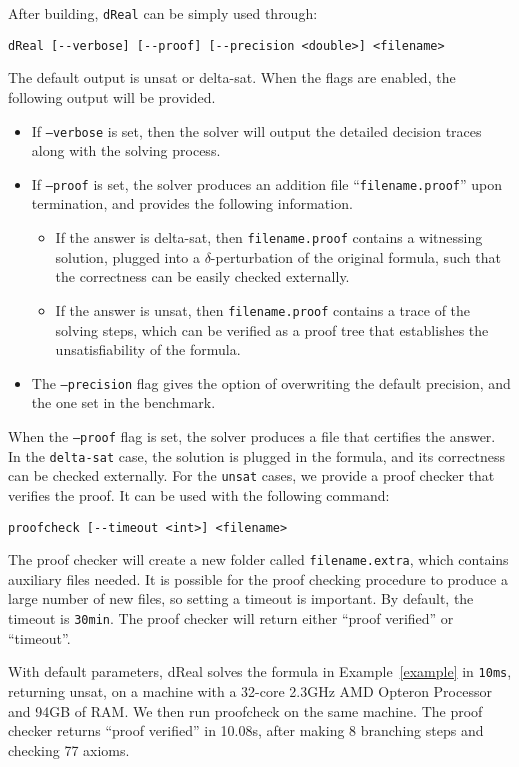 \documentclass[envcountsect]{llncs}
\begin{document}
After building, {\tt dReal} can be simply used through:
\begin{verbatim}
dReal [--verbose] [--proof] [--precision <double>] <filename>
\end{verbatim}
The default output is {\sf unsat} or {\sf delta-sat}. When the flags are
enabled, the following output will be provided.
\begin{itemize}
 \item If {\tt --verbose} is set, then the solver will output the detailed
decision traces along with the solving process. 
\item If {\tt --proof} is set, the solver produces an addition file
``{\tt filename.proof}'' upon termination, and provides the following
information.
\begin{itemize}
\item If the answer is {\sf delta-sat},
then {\tt filename.proof} contains a witnessing solution, plugged into a
$\delta$-perturbation of the original formula, such
that the correctness can be easily checked externally. 

\item If the answer is {\sf unsat}, then {\tt filename.proof} contains a trace
of the solving steps, which can be verified as a proof tree that establishes the
unsatisfiability of the formula.  
\end{itemize}
\item The {\tt --precision} flag gives the option of overwriting the
default precision, and the one set in the benchmark.
\end{itemize}
When the {\tt --proof} flag is set, the solver produces a file that certifies
the answer. In the {\tt delta-sat} case, the solution is plugged in the
formula, and its correctness can be checked externally. For the {\tt unsat}
cases, we provide a proof checker that verifies the proof. It can be used with the following command:
\begin{verbatim}
proofcheck [--timeout <int>] <filename>
\end{verbatim}
The proof checker will create a new folder called {\tt filename.extra}, which
contains auxiliary files needed. It is possible for the proof
checking procedure to produce a large number of new files, so setting a
 timeout is important. By default, the timeout is {\tt 30min}. The proof
checker will return either ``{\sf proof verified}'' or ``{\sf timeout}''.

\begin{example}
With default parameters, {\sf dReal} solves the formula in
Example~\ref{example} in {\tt 10ms}, returning {\sf unsat}, on a machine with
a 32-core 2.3GHz AMD Opteron Processor and 94GB of RAM. We then run {\sf proofcheck} on the same machine. The proof checker returns
``{\sf proof verified}'' in 10.08s, after making 8 branching steps and
checking 77 axioms.
\end{example}
\end{document}
